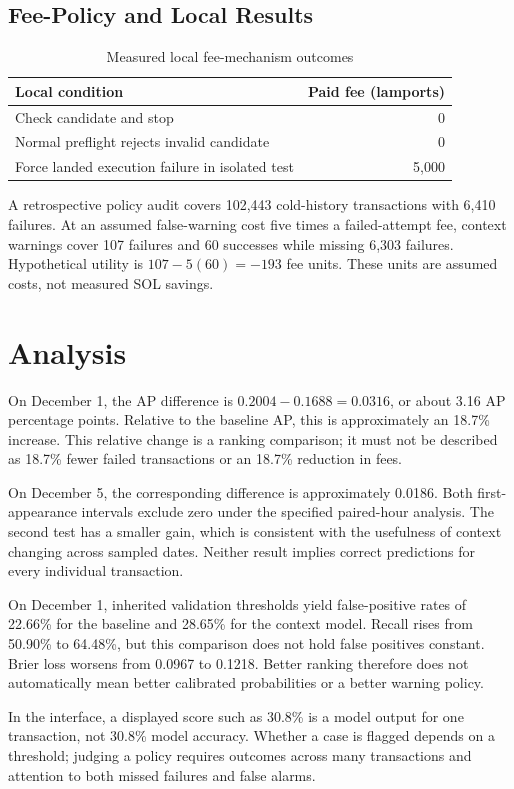 \documentclass[12pt,a4paper,oneside]{report}
\begin{document}
\subsection{Fee-Policy and Local Results}
\begin{table}[H]\centering\caption{Measured local fee-mechanism outcomes}
\begin{tabularx}{\textwidth}{Y r}\toprule Local condition&Paid fee (lamports)\\\midrule Check candidate and stop&0\\Normal preflight rejects invalid candidate&0\\Force landed execution failure in isolated test&5,000\\\bottomrule\end{tabularx}\end{table}
A retrospective policy audit covers 102,443 cold-history transactions with 6,410 failures. At an assumed false-warning cost five times a failed-attempt fee, context warnings cover 107 failures and 60 successes while missing 6,303 failures. Hypothetical utility is $107-5(60)=-193$ fee units. These units are assumed costs, not measured SOL savings.

\section{Analysis}
On December 1, the AP difference is $0.2004-0.1688=0.0316$, or about 3.16 AP percentage points. Relative to the baseline AP, this is approximately an 18.7\% increase. This relative change is a ranking comparison; it must not be described as 18.7\% fewer failed transactions or an 18.7\% reduction in fees.

On December 5, the corresponding difference is approximately 0.0186. Both first-appearance intervals exclude zero under the specified paired-hour analysis. The second test has a smaller gain, which is consistent with the usefulness of context changing across sampled dates. Neither result implies correct predictions for every individual transaction.

On December 1, inherited validation thresholds yield false-positive rates of 22.66\% for the baseline and 28.65\% for the context model. Recall rises from 50.90\% to 64.48\%, but this comparison does not hold false positives constant. Brier loss worsens from 0.0967 to 0.1218. Better ranking therefore does not automatically mean better calibrated probabilities or a better warning policy.

In the interface, a displayed score such as 30.8\% is a model output for one transaction, not 30.8\% model accuracy. Whether a case is flagged depends on a threshold; judging a policy requires outcomes across many transactions and attention to both missed failures and false alarms.
\end{document}
